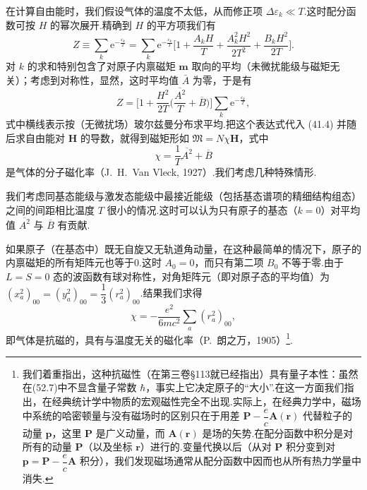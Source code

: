 在计算自由能时，我们假设气体的温度不太低，从而修正项 $\Delta\varepsilon_k\ll T$.这时配分函数可按 $H$ 的幂次展开.精确到 $H$ 的平方项我们有
\begin{equation*}
  Z\equiv\sum_k\mathrm{e}^{-\frac{\varepsilon_k}{T}}
  =\sum_k\mathrm{e}^{-\frac{\varepsilon_k}{T}}
  \Big[1+\frac{A_kH}{T}+\frac{A_k^2H^2}{2T^2}+\frac{B_kH^2}{2T}\Big].
\end{equation*}
对 $k$ 的求和特别包含了对原子内禀磁矩 $\boldsymbol{m}$ 取向的平均（未微扰能级与磁矩无关）；考虑到对称性，显然，这时平均值 $\bar{A}$ 为零，于是有
\begin{equation*}
  Z=\Big[1+\frac{H^2}{2T}\Big(\frac{\overline{A^2}}{T}+\overline{B}\Big)\Big]
  \sum_k\mathrm{e}^{-\frac{\varepsilon_k}{T}},
\end{equation*}
式中横线表示按（无微扰场）玻尔兹曼分布求平均.把这个表达式代入 (41.4) 并随后求自由能对 $\boldsymbol{H}$ 的导数，就得到磁矩形如 $\mathfrak{M}=N\chi\boldsymbol{H}$，式中
\begin{equation}
  \chi=\frac{1}{T}\overline{A^2}+\overline{B}
\end{equation}
是气体的分子磁化率（J.~H.~Van Vleck, 1927）.我们考虑几种特殊情形.

我们考虑同基态能级与激发态能级中最接近能级（包括基态谱项的精细结构组态）之间的间距相比温度 $T$ 很小的情况.这时可以认为只有原子的基态（$k=0$）对平均值 $\overline{A^2}$ 与 $\overline{B}$ 有贡献.

如果原子（在基态中）既无自旋又无轨道角动量，在这种最简单的情况下，原子的内禀磁矩的所有矩阵元也等于0.这时 $A_0=0$，而只有第二项 $B_0$ 不等于零.由于 $L=S=0$ 态的波函数有球对称性，对角矩阵元（即对原子态的平均值）为 $\left(x_a^2\right)_{00}=\left(y_a^2\right)_{00}=\dfrac{1}{3}\left(r_a^2\right)_{00}$.结果我们求得
\begin{equation}
  \chi=-\frac{e^2}{6mc^2}\sum_a\left(r_a^2\right)_{00},
\end{equation}
即气体是抗磁的，具有与温度无关的磁化率（P.~朗之万，1905）\footnote{我们着重指出，这种抗磁性（在第三卷§113就已经指出）具有量子本性：虽然在(52.7)中不显含量子常数 $\hbar$，事实上它决定原子的“大小”.在这一方面我们指出，在经典统计学中物质的宏观磁性完全不出现.实际上，在经典力学中，磁场中系统的哈密顿量与没有磁场时的区别只在于用差 $\boldsymbol{P}-\dfrac{e}{c}\boldsymbol{A}(\boldsymbol{r})$ 代替粒子的动量 $\boldsymbol{p}$，这里 $\boldsymbol{P}$ 是广义动量，而 $\boldsymbol{A}(\boldsymbol{r})$ 是场的矢势.在配分函数中积分是对所有的动量 $\boldsymbol{P}$（以及坐标 $\boldsymbol{r}$）进行的.变量代换以后（从对 $\boldsymbol{P}$ 积分变到对 $\boldsymbol{p}=\boldsymbol{P}-\dfrac{e}{c}\boldsymbol{A}$ 积分），我们发现磁场通常从配分函数中因而也从所有热力学量中消失.}.

